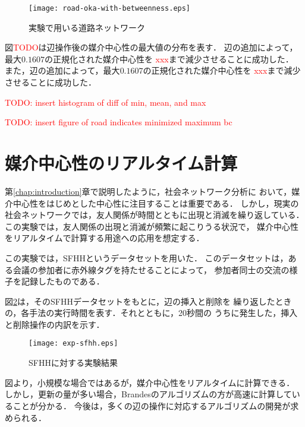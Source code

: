 \begin{figure}[tb]
  \centering
  \texttt{[image: road-oka-with-betweenness.eps]}
  \caption{実験で用いる道路ネットワーク}
  \label{fig:road-okayama}
\end{figure}

図\textcolor{red}{TODO}は辺操作後の媒介中心性の最大値の分布を表す．
辺の追加によって，最大$0.1607$の正規化された媒介中心性を
\textcolor{red}{xxx}まで減少させることに成功した．
また，辺の追加によって，最大$0.1607$の正規化された媒介中心性を
\textcolor{red}{xxx}まで減少させることに成功した．

\textcolor{red}{TODO: insert histogram of diff of min, mean, and max}

\textcolor{red}{TODO: insert figure of road indicates minimized maximum bc}

\section{媒介中心性のリアルタイム計算}

第\ref{chap:introduction}章で説明したように，社会ネットワーク分析に
おいて，媒介中心性をはじめとした中心性に注目することは重要である．
しかし，現実の社会ネットワークでは，友人関係が時間とともに出現と消滅を繰り返している．
この実験では，友人関係の出現と消滅が頻繁に起こりうる状況で，
媒介中心性をリアルタイムで計算する用途への応用を想定する．

この実験では，SFHH\cite{Genois2018}というデータセットを用いた．
このデータセットは，ある会議の参加者に赤外線タグを持たせることによって，
参加者同士の交流の様子を記録したものである．

図\ref{fig:exp-sfhh}は，そのSFHHデータセットをもとに，辺の挿入と削除を
繰り返したときの，各手法の実行時間を表す．それとともに，20秒間の
うちに発生した，挿入と削除操作の内訳を示す．

\begin{figure}[tb]
  \centering
  \texttt{[image: exp-sfhh.eps]}
  \caption{SFHHに対する実験結果}
  \label{fig:exp-sfhh}
\end{figure}

図より，小規模な場合ではあるが，媒介中心性をリアルタイムに計算できる．
しかし，更新の量が多い場合，Brandesのアルゴリズムの方が高速に計算していることが分かる．
今後は，多くの辺の操作に対応するアルゴリズムの開発が求められる．
